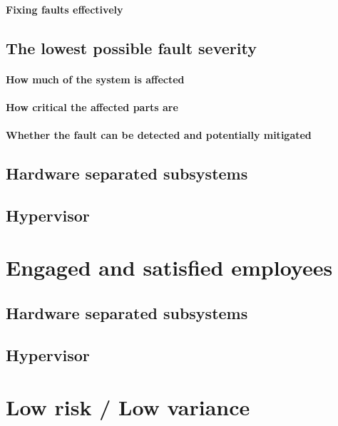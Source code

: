 \paragraph{Fixing faults effectively}
\subsection{The lowest possible fault severity}
\paragraph{How much of the system is affected}
\paragraph{How critical the affected parts are}
\paragraph{Whether the fault can be detected and potentially mitigated}

\subsection{Hardware separated subsystems}
\subsection{Hypervisor}


\section{Engaged and satisfied employees}
\subsection{Hardware separated subsystems}
\subsection{Hypervisor}


\section{Low risk / Low variance}
